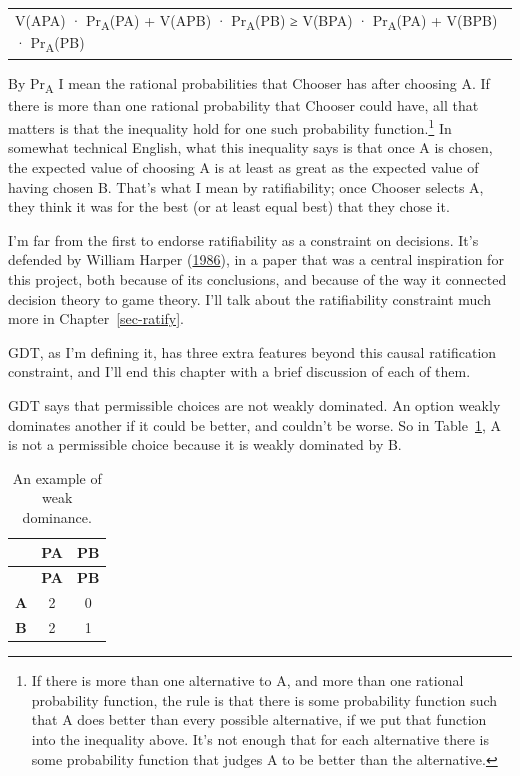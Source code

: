 \documentclass[
  12pt,
  letterpaper,
  DIV=11,
  numbers=noendperiod]{scrreprt}
\begin{document}
\begin{longtable}[]{@{}
  >{\centering\arraybackslash}p{}@{}}
\toprule\noalign{}
\endhead
\bottomrule\noalign{}
\endlastfoot
V(APA) · Pr\textsubscript{A}(PA) + V(APB) · Pr\textsubscript{A}(PB) ≥
V(BPA) · Pr\textsubscript{A}(PA) + V(BPB) · Pr\textsubscript{A}(PB) \\
\end{longtable}

By Pr\textsubscript{A} I mean the rational probabilities that Chooser
has after choosing A. If there is more than one rational probability
that Chooser could have, all that matters is that the inequality hold
for one such probability function.\footnote{If there is more than one
  alternative to A, and more than one rational probability function, the
  rule is that there is some probability function such that A does
  better than every possible alternative, if we put that function into
  the inequality above. It's not enough that for each alternative there
  is some probability function that judges A to be better than the
  alternative.} In somewhat technical English, what this inequality says
is that once A is chosen, the expected value of choosing A is at least
as great as the expected value of having chosen B. That's what I mean by
ratifiability; once Chooser selects A, they think it was for the best
(or at least equal best) that they chose it.

I'm far from the first to endorse ratifiability as a constraint on
decisions. It's defended by William Harper
(\protect\hyperlink{ref-Harper1986}{1986}), in a paper that was a
central inspiration for this project, both because of its conclusions,
and because of the way it connected decision theory to game theory. I'll
talk about the ratifiability constraint much more in
Chapter~\ref{sec-ratify}.

GDT, as I'm defining it, has three extra features beyond this causal
ratification constraint, and I'll end this chapter with a brief
discussion of each of them.

GDT says that permissible choices are not weakly dominated. An option
weakly dominates another if it could be better, and couldn't be worse.
So in Table~\ref{tbl-weak-dominance-example}, A is not a permissible
choice because it is weakly dominated by B.

\hypertarget{tbl-weak-dominance-example}{}
\begin{longtable}[]{@{}ccc@{}}
\caption{\label{tbl-weak-dominance-example}An example of weak
dominance.}\tabularnewline
\toprule\noalign{}
& \textbf{PA} & \textbf{PB} \\
\midrule\noalign{}
\endfirsthead
\toprule\noalign{}
& \textbf{PA} & \textbf{PB} \\
\midrule\noalign{}
\endhead
\bottomrule\noalign{}
\endlastfoot
\textbf{A} & 2 & 0 \\
\textbf{B} & 2 & 1 \\
\end{longtable}
\end{document}
